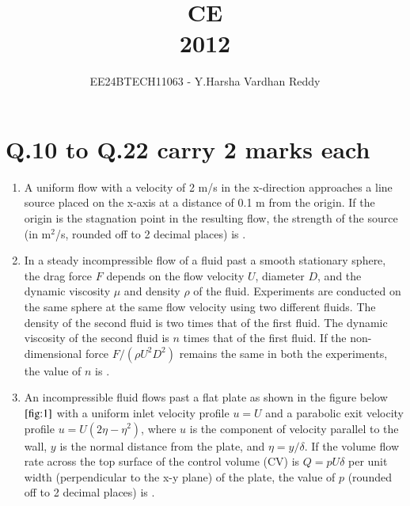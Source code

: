 \documentclass[journal]{IEEEtran}
\numberwithin{equation}{enumi}
\numberwithin{figure}{enumi}
\begin{document}

\vspace{3cm}

\title{CE\\2012}
\author{EE24BTECH11063 - Y.Harsha Vardhan Reddy}
\maketitle

\bigskip

\section*{Q.10 to Q.22 carry 2 marks each}
\begin{enumerate}
    \item A uniform flow with a velocity of 2 m/s in the x-direction approaches a line source placed on the x-axis at a distance of 0.1 m from the origin. If the origin is the stagnation point in the resulting flow, the strength of the source (in m$^2$/s, rounded off to 2 decimal places) is \underline{\hspace{1cm}}.
\bigskip

\item In a steady incompressible flow of a fluid past a smooth stationary sphere, the drag force $F$ depends on the flow velocity $U$, diameter $D$, and the dynamic viscosity $\mu$ and density $\rho$ of the fluid. Experiments are conducted on the same sphere at the same flow velocity using two different fluids. The density of the second fluid is two times that of the first fluid. The dynamic viscosity of the second fluid is $n$ times that of the first fluid. If the non-dimensional force $F / (\rho U^2 D^2)$ remains the same in both the experiments, the value of $n$ is \underline{\hspace{1cm}}.
\bigskip

\item An incompressible fluid flows past a flat plate as shown in the figure below$\ref{fig:1}$ with a uniform inlet velocity profile $u = U$ and a parabolic exit velocity profile $u = U(2\eta - \eta^2)$, where $u$ is the component of velocity parallel to the wall, $y$ is the normal distance from the plate, and $\eta = y / \delta$. If the volume flow rate across the top surface of the control volume (CV) is $Q = p U \delta$ per unit width (perpendicular to the x-y plane) of the plate, the value of $p$ (rounded off to 2 decimal places) is \underline{\hspace{1cm}}.
\begin{figure}[H]
    \centering
    
    \caption{}
    \label{fig:1}
\end{figure}
\bigskip


\end{enumerate}
\end{document}
